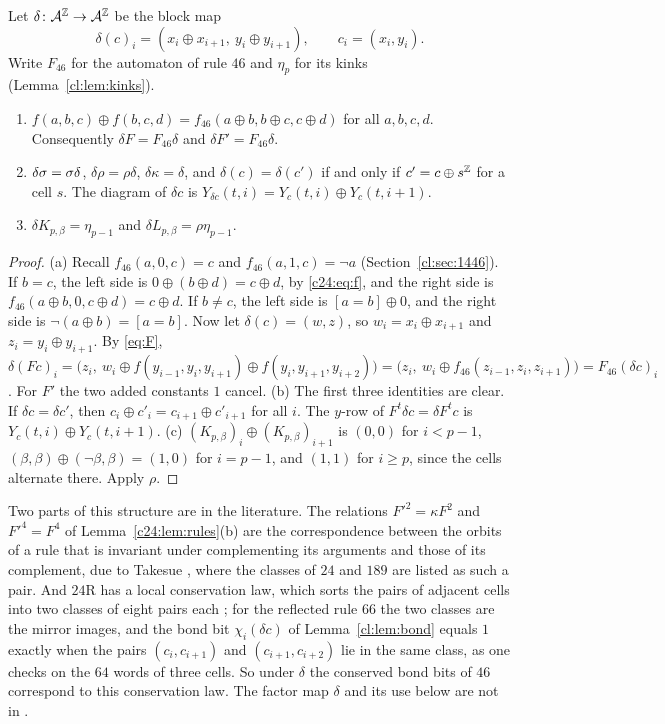 Let $\delta\colon\mathcal{A}^{\mathbb{Z}}\to\mathcal{A}^{\mathbb{Z}}$ be the block map
\[
\delta(c)_i=(x_i\oplus x_{i+1},\ y_i\oplus y_{i+1}),\qquad c_i=(x_i,y_i).
\]
Write $F_{46}$ for the automaton of rule $46$ and $\eta_p$ for its kinks (Lemma~\ref{cl:lem:kinks}).

\begin{lemma}\label{c24:lem:delta}
\begin{enumerate}
\item[(a)] $f(a,b,c)\oplus f(b,c,d)=f_{46}(a\oplus b,b\oplus c,c\oplus d)$ for all $a,b,c,d$. Consequently $\delta F=F_{46}\delta$ and $\delta F'=F_{46}\delta$.
\item[(b)] $\delta\sigma=\sigma\delta$, $\delta\rho=\rho\delta$, $\delta\kappa=\delta$, and $\delta(c)=\delta(c')$ if and only if $c'=c\oplus s^{\mathbb{Z}}$ for a cell $s$. The diagram of $\delta c$ is $Y_{\delta c}(t,i)=Y_c(t,i)\oplus Y_c(t,i+1)$.
\item[(c)] $\delta K_{p,\beta}=\eta_{p-1}$ and $\delta L_{p,\beta}=\rho\eta_{p-1}$.
\end{enumerate}
\end{lemma}

\begin{proof}
(a) Recall $f_{46}(a,0,c)=c$ and $f_{46}(a,1,c)=\neg a$ (Section~\ref{cl:sec:1446}). If $b=c$, the left side is $0\oplus(b\oplus d)=c\oplus d$, by \eqref{c24:eq:f}, and the right side is $f_{46}(a\oplus b,0,c\oplus d)=c\oplus d$. If $b\ne c$, the left side is $[a=b]\oplus0$, and the right side is $\neg(a\oplus b)=[a=b]$. Now let $\delta(c)=(w,z)$, so $w_i=x_i\oplus x_{i+1}$ and $z_i=y_i\oplus y_{i+1}$. By \eqref{eq:F}, $\delta(Fc)_i=\bigl(z_i,\ w_i\oplus f(y_{i-1},y_i,y_{i+1})\oplus f(y_i,y_{i+1},y_{i+2})\bigr)=\bigl(z_i,\ w_i\oplus f_{46}(z_{i-1},z_i,z_{i+1})\bigr)=F_{46}(\delta c)_i$. For $F'$ the two added constants $1$ cancel. (b) The first three identities are clear. If $\delta c=\delta c'$, then $c_i\oplus c'_i=c_{i+1}\oplus c'_{i+1}$ for all $i$. The $y$-row of $F^t\delta c=\delta F^tc$ is $Y_c(t,i)\oplus Y_c(t,i+1)$. (c) $(K_{p,\beta})_i\oplus(K_{p,\beta})_{i+1}$ is $(0,0)$ for $i<p-1$, $(\beta,\beta)\oplus(\neg\beta,\beta)=(1,0)$ for $i=p-1$, and $(1,1)$ for $i\ge p$, since the cells alternate there. Apply $\rho$.
\end{proof}

Two parts of this structure are in the literature. The relations $F'^2=\kappa F^2$ and $F'^4=F^4$ of Lemma~\ref{c24:lem:rules}(b) are the correspondence between the orbits of a rule that is invariant under complementing its arguments and those of its complement, due to Takesue \cite[(A.1)--(A.4)]{Takesue1989}, where the classes of $24$ and $189$ are listed as such a pair. And $24$R has a local conservation law, which sorts the pairs of adjacent cells into two classes of eight pairs each \cite[(4.9), (4.10)]{Takesue1989}; for the reflected rule $66$ the two classes are the mirror images, and the bond bit $\chi_i(\delta c)$ of Lemma~\ref{cl:lem:bond} equals $1$ exactly when the pairs $(c_i,c_{i+1})$ and $(c_{i+1},c_{i+2})$ lie in the same class, as one checks on the $64$ words of three cells. So under $\delta$ the conserved bond bits of $46$ correspond to this conservation law. The factor map $\delta$ and its use below are not in \cite{Takesue1989}.

